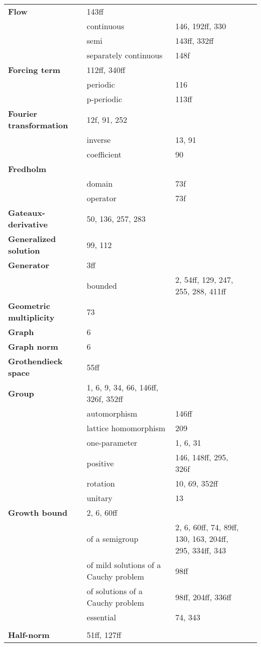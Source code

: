 \documentclass[10pt]{scrartcl}
\begin{document}
\begin{longtable}{>{\bfseries}p{4cm}p{4cm}p{4cm}p{4cm}}
Flow 	& 143ff \\
	& continuous 	& 146, 192ff, 330 \\
	& semi 	& 143ff, 332ff \\
	& separately continuous 	& 148f \\
Forcing term 	& 112ff, 340ff \\
	& periodic 	& 116 \\
	& p-periodic 	& 113ff \\
Fourier transformation 	& 12f, 91, 252 \\
	& inverse 	& 13, 91 \\
	& coefficient 	& 90 \\
Fredholm 	& \\
	& domain 	& 73f \\
	& operator 	& 73f \\
Gateaux-derivative 	& 50, 136, 257, 283 \\
Generalized solution 	& 99, 112 \\
Generator 	& 3ff \\
	& bounded 	& 2, 54ff, 129, 247, 255, 288, 411ff\\
Geometric multiplicity 	& 73 \\
Graph 	& 6 \\
Graph norm 	& 6 \\
Grothendieck space 	& 55ff \\
Group 	& 1, 6, 9, 34, 66, 146ff, 326f, 352ff\\
	& automorphism 	& 146ff \\
	& lattice homomorphism 	& 209 \\
	& one-parameter 	& 1, 6, 31 \\
	& positive 	& 146, 148ff, 295, 326f \\
	& rotation 	& 10, 69, 352ff \\
	& unitary 	& 13 \\
Growth bound 	& 2, 6, 60ff \\
	& of a semigroup 	& 2, 6, 60ff, 74, 89ff, 130, 163, 204ff, 295, 334ff, 343 \\
	& of mild solutions of a Cauchy problem 	& 98ff \\
	& of solutions of a Cauchy problem 	& 98ff, 204ff, 336ff \\
	& essential 	& 74, 343 \\
	& \\
Half-norm 	& 51ff, 127ff \\

\end{longtable}
\end{document}
